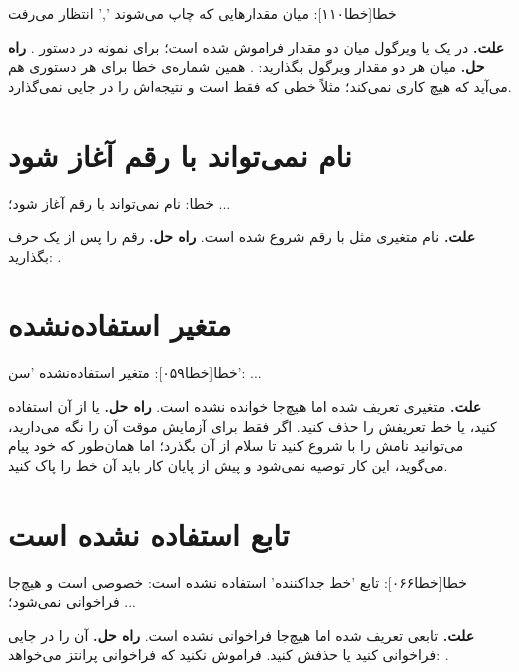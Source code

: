 \begin{progoutfa}
خطا[خطا۱۱۰]: میان مقدارهایی که چاپ می‌شوند ',' انتظار می‌رفت
\end{progoutfa}

\textbf{علت.} در یک  یا  ویرگول میان دو مقدار فراموش
شده است؛ برای نمونه در دستور \mbox{}.
\textbf{راه حل.} میان هر دو مقدار ویرگول بگذارید: \mbox{}.
همین شماره‌ی خطا برای هر دستوری هم می‌آید که هیچ کاری نمی‌کند؛ مثلاً خطی که
فقط  است و نتیجه‌اش را در جایی نمی‌گذارد.

\section*{نام نمی‌تواند با رقم آغاز شود}

\begin{progoutfa}
خطا: نام نمی‌تواند با رقم آغاز شود؛ ...
\end{progoutfa}

\textbf{علت.} نام متغیری مثل  با رقم شروع شده است.
\textbf{راه حل.} رقم را پس از یک حرف بگذارید: .

\section*{متغیر استفاده‌نشده}

\begin{progoutfa}
خطا[خطا۰۵۹]: متغیر استفاده‌نشده 'سن': ...
\end{progoutfa}

\textbf{علت.} متغیری تعریف شده اما هیچ‌جا خوانده نشده است.
\textbf{راه حل.} یا از آن استفاده کنید، یا خط تعریفش را حذف کنید. اگر
فقط برای آزمایش موقت آن را نگه می‌دارید، می‌توانید نامش را با
\code{\_} شروع کنید تا سلام از آن بگذرد؛ اما همان‌طور که خود پیام می‌گوید،
این کار توصیه نمی‌شود و پیش از پایان کار باید آن خط را پاک کنید.

\section*{تابع استفاده نشده است}

\begin{progoutfa}
خطا[خطا۰۶۶]: تابع 'خط جداکننده' استفاده نشده است: خصوصی است و هیچ‌جا فراخوانی نمی‌شود؛ ...
\end{progoutfa}

\textbf{علت.} تابعی تعریف شده اما هیچ‌جا فراخوانی نشده است.
\textbf{راه حل.} آن را در جایی فراخوانی کنید یا حذفش کنید. فراموش نکنید
که فراخوانی پرانتز می‌خواهد: \mbox{}.

